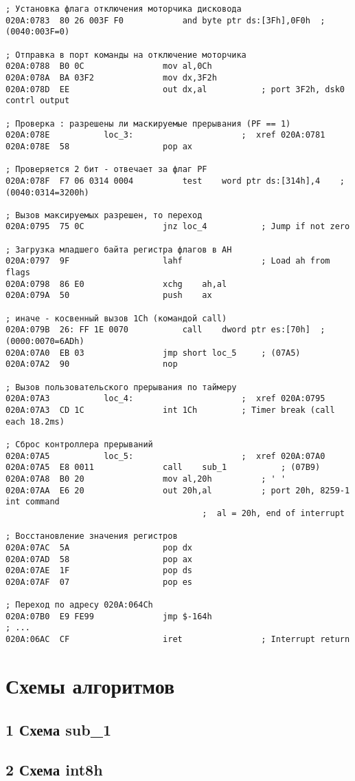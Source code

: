 \begin{lstlisting}[style={asm}]
; Установка флага отключения моторчика дисковода
020A:0783  80 26 003F F0			and	byte ptr ds:[3Fh],0F0h	; (0040:003F=0)

; Отправка в порт команды на отключение моторчика
020A:0788  B0 0C				mov	al,0Ch
020A:078A  BA 03F2				mov	dx,3F2h
020A:078D  EE					out	dx,al			; port 3F2h, dsk0 contrl output

; Проверка : разрешены ли маскируемые прерывания (PF == 1)
020A:078E			loc_3:						;  xref 020A:0781
020A:078E  58					pop	ax

; Проверяется 2 бит - отвечает за флаг PF
020A:078F  F7 06 0314 0004			test	word ptr ds:[314h],4	; (0040:0314=3200h)

; Вызов максируемых разрешен, то переход
020A:0795  75 0C				jnz	loc_4			; Jump if not zero

; Загрузка младшего байта регистра флагов в AH
020A:0797  9F					lahf				; Load ah from flags
020A:0798  86 E0				xchg	ah,al
020A:079A  50					push	ax

; иначе - косвенный вызов 1Ch (командой call)
020A:079B  26: FF 1E 0070			call	dword ptr es:[70h]	; (0000:0070=6ADh)
020A:07A0  EB 03				jmp	short loc_5		; (07A5)
020A:07A2  90					nop

; Вызов пользовательского прерывания по таймеру
020A:07A3			loc_4:						;  xref 020A:0795
020A:07A3  CD 1C				int	1Ch			; Timer break (call each 18.2ms)

; Сброс контроллера прерываний
020A:07A5			loc_5:						;  xref 020A:07A0
020A:07A5  E8 0011				call	sub_1			; (07B9)
020A:07A8  B0 20				mov	al,20h			; ' '
020A:07AA  E6 20				out	20h,al			; port 20h, 8259-1 int command
										;  al = 20h, end of interrupt

; Восстановление значения регистров
020A:07AC  5A					pop	dx
020A:07AD  58					pop	ax
020A:07AE  1F					pop	ds
020A:07AF  07					pop	es

; Переход по адресу 020A:064Ch
020A:07B0  E9 FE99				jmp	$-164h
; ...
020A:06AC  CF					iret				; Interrupt return
\end{lstlisting}

\clearpage

\section*{Схемы алгоритмов}

\subsection*{1 Схема sub\_1} 
\clearpage

\subsection*{2 Схема int8h} 
\clearpage
{}
\clearpage
{}